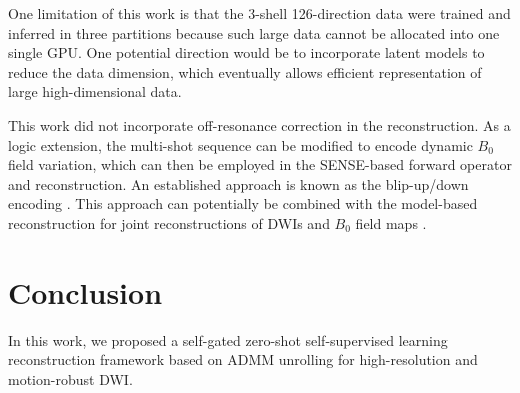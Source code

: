 \documentclass[journal,twoside,web]{ieeecolor}
\begin{document}
	One limitation of this work is that the 3-shell 126-direction data 
	were trained and inferred in three partitions 
	because such large data cannot be allocated into one single GPU. 
	One potential direction would be to incorporate latent models \cite{kingma_2014_vae} 
	to reduce the data dimension, which eventually allows efficient representation 
	of large high-dimensional data.

	This work did not incorporate off-resonance correction in the reconstruction.
	As a logic extension, the multi-shot sequence can be modified
	to encode dynamic $B_0$ field variation, which can then be employed in the SENSE-based forward operator and reconstruction. An established approach
	is known as the blip-up/down encoding \cite{zahneisen_2017_blipud}.
	This approach can potentially be combined with the model-based reconstruction
	for joint reconstructions of DWIs and $B_0$ field maps \cite{tan_2022_meco}.

	\section{Conclusion}

	In this work, we proposed a self-gated zero-shot self-supervised learning
	reconstruction framework based on ADMM unrolling
	for high-resolution and motion-robust DWI.




	
	
\end{document}
